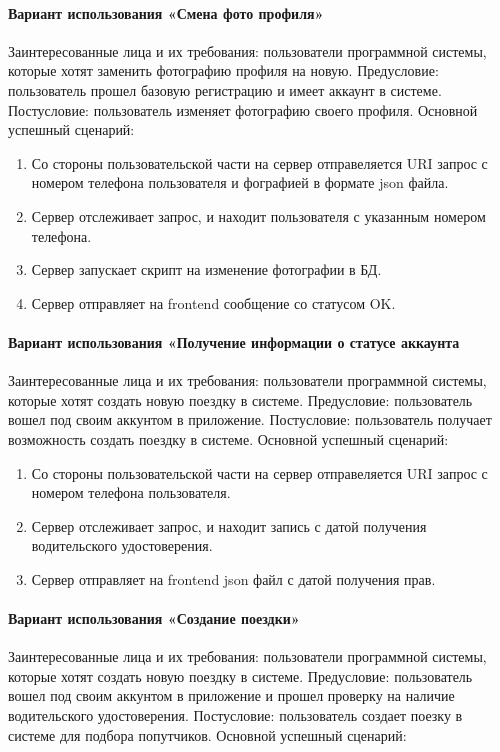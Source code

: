 \paragraph{Вариант использования «Смена фото профиля»}
Заинтересованные лица и их требования: пользователи программной системы, которые хотят заменить фотографию профиля на новую. Предусловие: пользователь прошел базовую регистрацию и имеет аккаунт в системе. Постусловие: пользователь изменяет фотографию своего профиля.
Основной успешный сценарий:

\begin{enumerate}
	\item Со стороны пользовательской части на сервер отправеляется URI запрос с номером телефона пользователя и фографией в формате json файла.
	\item Сервер отслеживает запрос, и находит пользователя с указанным номером телефона.
	\item Сервер запускает скрипт на изменение фотографии в БД.
	\item Сервер отправляет на frontend сообщение со статусом OK.
\end{enumerate}

\paragraph{Вариант использования «Получение информации о статусе аккаунта}
Заинтересованные лица и их требования: пользователи программной системы, которые хотят создать новую поездку в системе. Предусловие:  пользователь вошел под своим аккунтом в приложение. Постусловие: пользователь получает возможность создать поездку в системе.
Основной успешный сценарий:

\begin{enumerate}
	\item Со стороны пользовательской части на сервер отправеляется URI запрос с номером телефона пользователя.
	\item Сервер отслеживает запрос, и находит запись с датой получения водительского удостоверения.
	\item Сервер отправляет на frontend json файл с датой получения прав.
\end{enumerate}

\paragraph{Вариант использования «Создание поездки»}
Заинтересованные лица и их требования: пользователи программной системы, которые хотят создать новую поездку в системе. Предусловие:  пользователь вошел под своим аккунтом в приложение и прошел проверку на наличие водительского удостоверения. Постусловие: пользователь создает поезку в системе для подбора попутчиков.
Основной успешный сценарий:

